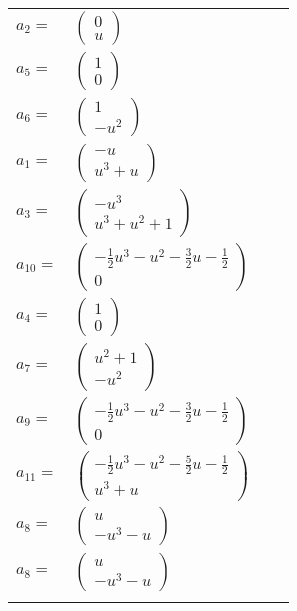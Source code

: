 \documentclass[1p]{elsarticle_modified}
\theoremstyle{definition}
\begin{document}
\begin{tabular}{m{7pt} m{180pt} m{7pt} m{180pt} }
\flushright $a_{2}=$&$\begin{pmatrix}0\\u\end{pmatrix}$ \\
\flushright $a_{5}=$&$\begin{pmatrix}1\\0\end{pmatrix}$ \\
\flushright $a_{6}=$&$\begin{pmatrix}1\\- u^2\end{pmatrix}$ \\
\flushright $a_{1}=$&$\begin{pmatrix}- u\\u^3+u\end{pmatrix}$ \\
\flushright $a_{3}=$&$\begin{pmatrix}- u^3\\u^3+u^2+1\end{pmatrix}$ \\
\flushright $a_{10}=$&$\begin{pmatrix}-\frac{1}{2} u^3- u^2-\frac{3}{2} u-\frac{1}{2}\\0\end{pmatrix}$ \\
\flushright $a_{4}=$&$\begin{pmatrix}1\\0\end{pmatrix}$ \\
\flushright $a_{7}=$&$\begin{pmatrix}u^2+1\\- u^2\end{pmatrix}$ \\
\flushright $a_{9}=$&$\begin{pmatrix}-\frac{1}{2} u^3- u^2-\frac{3}{2} u-\frac{1}{2}\\0\end{pmatrix}$ \\
\flushright $a_{11}=$&$\begin{pmatrix}-\frac{1}{2} u^3- u^2-\frac{5}{2} u-\frac{1}{2}\\u^3+u\end{pmatrix}$ \\
\flushright $a_{8}=$&$\begin{pmatrix}u\\- u^3- u\end{pmatrix}$\\ \flushright $a_{8}=$&$\begin{pmatrix}u\\- u^3- u\end{pmatrix}$\\&\end{tabular}
\end{document}
